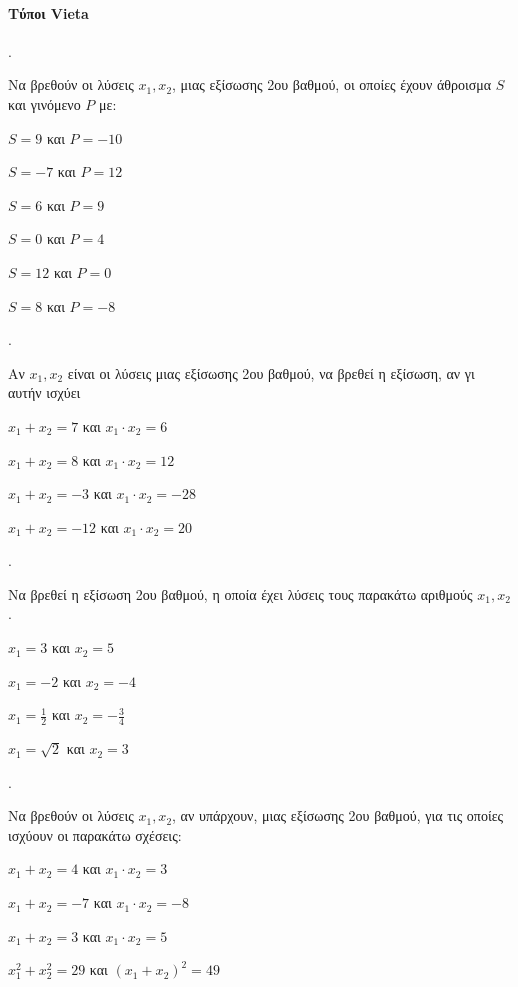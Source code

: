 \documentclass[11pt,a4paper,twocolumn]{article}
\newcounter{askhsh}
\newcommand{\askhsh}{{\large\theaskhsh.}\ \addtocounter{askhsh}{1}}
\newcommand{\eng}[1]{\selectlanguage{english}#1\selectlanguage{greek}}
\begin{document}
\paragraph{Τύποι \eng{Vieta}}
\askhsh
Να βρεθούν οι λύσεις $ x_1, x_2 $, μιας εξίσωσης 2{ου} βαθμού, οι οποίες έχουν άθροισμα $ S $ και γινόμενο $ P $ με:
\begin{multicols}{2}
\begin{alist}[leftmargin=5mm]
\item $ S=9 $ και $ P=-10 $
\item $ S=-7 $ και $ P=12 $
\item $ S=6 $ και $ P=9 $
\item $ S=0 $ και $ P=4 $
\item $ S=12 $ και $ P=0 $
\item $ S=8 $ και $ P=-8 $
\end{alist}
\end{multicols}
\askhsh 
Αν $ x_1, x_2 $ είναι οι λύσεις μιας εξίσωσης 2{ου} βαθμού, να βρεθεί η εξίσωση, αν γι αυτήν ισχύει
\begin{alist}
\item $ x_1+x_2=7 $ και $ x_1\cdot x_2=6 $
\item $ x_1+x_2=8 $ και $ x_1\cdot x_2=12 $
\item $ x_1+x_2=-3 $ και $ x_1\cdot x_2=-28 $
\item $ x_1+x_2=-12 $ και $ x_1\cdot x_2=20 $
\end{alist}
\askhsh
Να βρεθεί η εξίσωση 2{ου} βαθμού, η οποία έχει λύσεις τους παρακάτω αριθμούς $ x_1,x_2 $.
\begin{alist}
\item $ x_1=3 $ και $ x_2=5 $
\item $ x_1=-2 $ και $ x_2=-4 $
\item $ x_1=\frac{1}{2} $ και $ x_2=-\frac{3}{4} $
\item $ x_1=\sqrt{2} $ και $ x_2=3 $
\end{alist}
\askhsh
Να βρεθούν οι λύσεις $ x_1, x_2 $, αν υπάρχουν, μιας εξίσωσης 2{ου} βαθμού, για τις οποίες ισχύουν οι παρακάτω σχέσεις:
\begin{alist}
\item $ x_1+x_2=4 $ και $ x_1\cdot x_2=3 $
\item $ x_1+x_2=-7 $ και $ x_1\cdot x_2=-8 $
\item $ x_1+x_2=3 $ και $ x_1\cdot x_2=5 $
\item $ x_1^2+x_2^2=29 $ και $ (x_1+x_2)^2=49 $
\end{alist}
\end{document}

